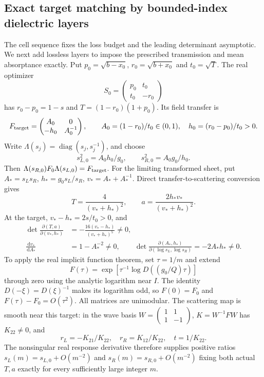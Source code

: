 \documentclass[11pt,a4paper]{article}
\theoremstyle{remark}
\newcommand{\dd}{\,\mathrm d}
\newcommand{\diag}{\operatorname{diag}}
\begin{document}
\subsection{Exact target matching by bounded-index dielectric layers}
The cell sequence fixes the loss budget and the leading determinant asymptotic. We next add lossless layers to impose the prescribed transmission and mean absorptance exactly. Put $p_0=\sqrt{b-x_0}$, $r_0=\sqrt{b+x_0}$ and $t_0=\sqrt T$. The real optimizer
\[
 S_0=\begin{pmatrix}p_0&t_0\\t_0&-r_0\end{pmatrix}
\]
has $r_0-p_0=1-s$ and $T=(1-r_0)(1+p_0)$. Its field transfer is
\[
 F_{\rm target}=\begin{pmatrix}A_0&0\\-h_0&A_0^{-1}\end{pmatrix},\qquad
 A_0=(1-r_0)/t_0\in(0,1),\quad h_0=(r_0-p_0)/t_0>0.
\]
Write $\Lambda(s_j)=\diag(s_j,s_j^{-1})$, and choose
\[
 s_{L,0}^2=A_0h_0/g_0,\qquad s_{R,0}^2=A_0g_0/h_0.
\]
Then $\Lambda(s_{R,0})F_0\Lambda(s_{L,0})=F_{\rm target}$. For the limiting transformed sheet, put $A_*=s_Ls_R$, $h_*=g_0s_L/s_R$, $v_*=A_*+A_*^{-1}$. Direct transfer-to-scattering conversion gives
\[
 T=\frac4{(v_*+h_*)^2},\qquad a=\frac{2h_*v_*}{(v_*+h_*)^2}.
\]
At the target, $v_*-h_*=2s/t_0>0$, and
\begin{align*}
 \det\frac{\partial(T,a)}{\partial(v_*,h_*)}
 &=-\frac{16(v_*-h_*)}{(v_*+h_*)^5}\ne0,\\
 \frac{\dd v_*}{\dd A_*}&=1-A_*^{-2}\ne0,\qquad
 \det\frac{\partial(A_*,h_*)}{\partial(\log s_L,\log s_R)}=-2A_*h_*\ne0.
\end{align*}
To apply the real implicit function theorem, set $\tau=1/m$ and extend
\[
 F(\tau)=\exp\left[\tau^{-1}\log D((g_0/Q)\tau)\right]
\]
through zero using the analytic logarithm near $I$. The identity $D(-\xi)=D(\xi)^{-1}$ makes its logarithm odd, so $F(0)=F_0$ and $F(\tau)-F_0=O(\tau^2)$. All matrices are unimodular. The scattering map is smooth near this target: in the wave basis $W=\left(\begin{smallmatrix}1&1\\1&-1\end{smallmatrix}\right)$, $K=W^{-1}FW$ has $K_{22}\ne0$, and
\[
 r_L=-K_{21}/K_{22},\quad r_R=K_{12}/K_{22},\quad t=1/K_{22}.
\]
The nonsingular real response derivative therefore supplies positive ratios $s_L(m)=s_{L,0}+O(m^{-2})$ and $s_R(m)=s_{R,0}+O(m^{-2})$ fixing both actual $T,a$ exactly for every sufficiently large integer $m$.
\end{document}
